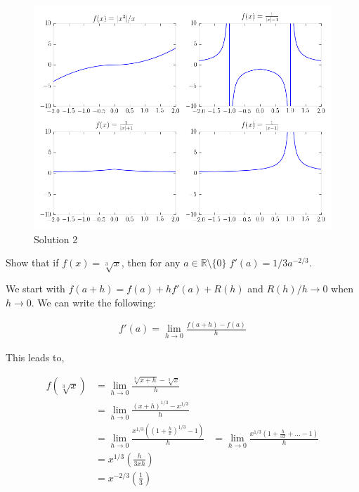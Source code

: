 \documentclass[answers,addpoints]{exam}
\begin{document}
\begin{questions}
\begin{solution}
        \begin{figure}[H]
            \begin{center}
                \includegraphics[width=1\textwidth]{solution2.png}
            \end{center}
            \caption{Solution 2}
            \label{fig:sol2}
        \end{figure}

    \end{solution}

    \question[5]

    Show that if $f(x) = \sqrt[3]{x}$, then for any $a \in \mathbb{R} \setminus
    \{0\}\; f'(a) = 1/3a^{-2/3}$.

    \begin{solution}

        We start with $f(a+h) = f(a) + h f'(a) + R(h)$ and $R(h)/h
        \rightarrow 0$ when $h \rightarrow 0$. We can write the following:

        \begin{align}
            f'(a)  = \lim_{h \rightarrow 0} \frac{ f(a+h) - f(a) }{h}  
        \end{align}

        This leads to,

        \begin{align}
            f(\sqrt[3]{x}) &= \lim_{h \rightarrow 0} \frac{ \sqrt[3]{x+h} - \sqrt[3]{x} }{h}  \\
                           &= \lim_{h \rightarrow 0} \frac{ (x+h)^{1/3} - x^{1/3} }{h} \\
                           &= \lim_{h \rightarrow 0} \frac{ x^{1/3} \left( 
        \left( 1 + \frac{h}{x}  \right)^{1/3} -1 \right)  }{h}
                           &= \lim_{h \rightarrow 0} \frac{ x^{1/3} \left( 
        1 + \frac{h}{3x} + \ldots  -1 \right)  }{h} \\
                            &= x^{1/3} \left( \frac{h}{3xh} \right) \\
                            &= x^{-2/3} \left( \frac{1}{3} \right) 
        \end{align}



\end{solution}
\end{questions}
\end{document}
